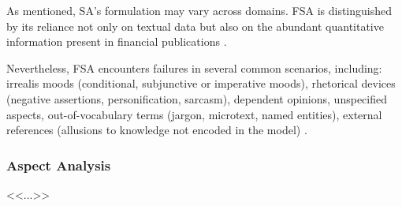 As mentioned, SA's formulation may vary across domains. FSA is distinguished by its reliance not only
on textual data but also on the abundant quantitative information present in financial publications
\parencite{FSA2024techniques}.

Nevertheless, FSA encounters failures in several common scenarios, including: irrealis moods (conditional,
subjunctive or imperative moods), rhetorical devices (negative assertions, personification, sarcasm),
dependent opinions, unspecified aspects, out-of-vocabulary terms (jargon, microtext, named entities),
external references (allusions to knowledge not encoded in the model) \parencite{FSA2020problems}.

\subsubsection{Aspect Analysis}
\label{sec:absa}
<<...>>